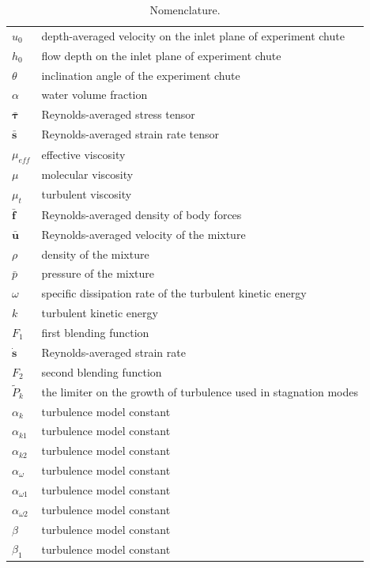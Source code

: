 \documentclass[mathematics,article,submit,pdftex,moreauthors]{Definitions/mdpi}
\begin{document}
\begin{table}[H] 
\caption{Nomenclature.\label{A:tab1}}
\begin{tabularx}{\textwidth}{ll}
\toprule
$u_0$		& depth-averaged velocity on the inlet plane of experiment chute	\\
$h_0$		& flow depth on the inlet plane of experiment chute	\\
$\theta$	& inclination angle of the experiment chute \\
$\alpha$	& water volume fraction	\\
$\bar{\boldsymbol{\tau}}$	& Reynolds-averaged stress tensor	\\
$\bar{\boldsymbol{s}}$		& Reynolds-averaged strain rate tensor	\\
$\mu_{eff}$		& effective viscosity	\\
$\mu$		& molecular viscosity	\\
$\mu_{t}$		& turbulent viscosity	\\
$\bar{\boldsymbol{f}}$		& Reynolds-averaged density of body forces	\\
$\bar{\boldsymbol{u}}$		& Reynolds-averaged velocity of the mixture	\\
$\rho$		& density of the mixture	\\
$\bar{p}$		& pressure of the mixture	\\
$\omega$		& specific dissipation rate of the turbulent kinetic energy	\\
$k$		& 	turbulent kinetic energy \\
$F_1$		& first blending function	\\
$\dot{\boldsymbol{s}}$		& Reynolds-averaged strain rate	\\
$F_2$		& second blending function	\\
$\widetilde{P}_k$ & the limiter on the growth of turbulence used in stagnation modes \\
$\alpha_k$ & turbulence model constant \\
$\alpha_{k1}$ & turbulence model constant \\
$\alpha_{k2}$ & turbulence model constant \\
$\alpha_\omega$ & turbulence model constant \\
$\alpha_{\omega1}$ & turbulence model constant \\
$\alpha_{\omega2}$ & turbulence model constant \\
$\beta$ & turbulence model constant \\
$\beta_1$ & turbulence model constant \\

\end{tabularx}
\end{table}
\end{document}
